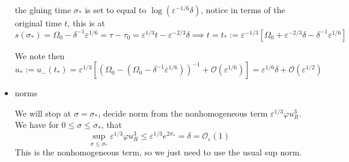 \documentclass[letterpaper,11pt]{article}
\newcommand{\rmO}{\mathcal{O}}
\newcommand{\eps}{\varepsilon}
\numberwithin{equation}{section}
\theoremstyle{plain}
\begin{document}
\begin{itemize}
the gluing time $\sigma_*$ is set to equal to $ \log(\eps^{-1/6}\delta )$, notice in terms of the original time $t$, this is at
\[
s(\sigma_*) = \Omega_0-\delta^{-1}\eps^{1/6} = \tau -\tau_0 = \eps^{1/3}t - \eps^{-2/3}\delta \implies   t=t_*:= \eps^{-1/3}[\Omega_0+\eps^{-2/3}\delta -\delta^{-1} \eps^{1/6}]
\]

We note then 
\[
u_*:= u_-(t_*) = \eps^{1/3}[(\Omega_0-(\Omega_0-\delta^{-1}\eps^{1/6}))^{-1} + \rmO(\eps^{1/6})]  = \eps^{1/6}\delta+\rmO(\eps^{1/2})
\]
\item norms

We will stop at  $\sigma=\sigma_*$, decide norm from the nonhomogeneous term $\eps^{1/3}\varphi u_R^3 $. We have for $0 \le \sigma \le \sigma_*$, that
\[
\sup_{\sigma \le \sigma_*} \eps^{1/3}\varphi u_R^3 \le \eps^{1/3}e^{2\sigma_*} = \delta = \rmO_\eps(1)
\]
This is the nonhomogeneous term, so we just need to use the usual sup norm.
\end{itemize} 
\end{document}
